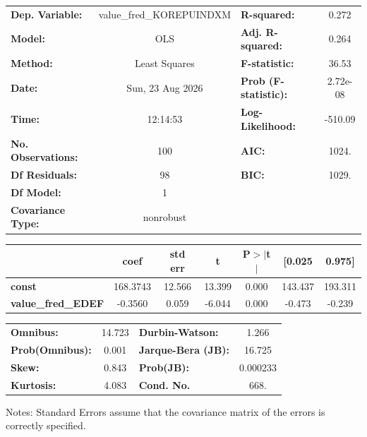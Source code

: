 \begin{center}
\begin{tabular}{lclc}
\toprule
\textbf{Dep. Variable:}    & value\_fred\_KOREPUINDXM & \textbf{  R-squared:         } &     0.272   \\
\textbf{Model:}            &           OLS            & \textbf{  Adj. R-squared:    } &     0.264   \\
\textbf{Method:}           &      Least Squares       & \textbf{  F-statistic:       } &     36.53   \\
\textbf{Date:}             &     Sun, 23 Aug 2026     & \textbf{  Prob (F-statistic):} &  2.72e-08   \\
\textbf{Time:}             &         12:14:53         & \textbf{  Log-Likelihood:    } &   -510.09   \\
\textbf{No. Observations:} &             100          & \textbf{  AIC:               } &     1024.   \\
\textbf{Df Residuals:}     &              98          & \textbf{  BIC:               } &     1029.   \\
\textbf{Df Model:}         &               1          & \textbf{                     } &             \\
\textbf{Covariance Type:}  &        nonrobust         & \textbf{                     } &             \\
\bottomrule
\end{tabular}
\begin{tabular}{lcccccc}
                           & \textbf{coef} & \textbf{std err} & \textbf{t} & \textbf{P$> |$t$|$} & \textbf{[0.025} & \textbf{0.975]}  \\
\midrule
\textbf{const}             &     168.3743  &       12.566     &    13.399  &         0.000        &      143.437    &      193.311     \\
\textbf{value\_fred\_EDEF} &      -0.3560  &        0.059     &    -6.044  &         0.000        &       -0.473    &       -0.239     \\
\bottomrule
\end{tabular}
\begin{tabular}{lclc}
\textbf{Omnibus:}       & 14.723 & \textbf{  Durbin-Watson:     } &    1.266  \\
\textbf{Prob(Omnibus):} &  0.001 & \textbf{  Jarque-Bera (JB):  } &   16.725  \\
\textbf{Skew:}          &  0.843 & \textbf{  Prob(JB):          } & 0.000233  \\
\textbf{Kurtosis:}      &  4.083 & \textbf{  Cond. No.          } &     668.  \\
\bottomrule
\end{tabular}
\end{center}

Notes: \newline
 [1] Standard Errors assume that the covariance matrix of the errors is correctly specified.